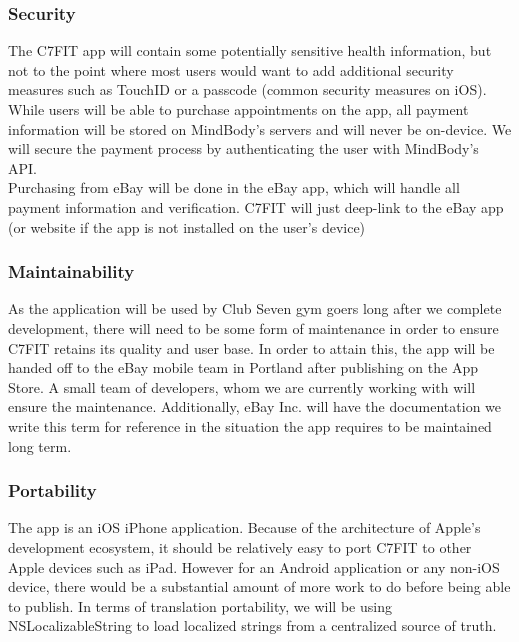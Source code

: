 \documentclass[letterpaper,10pt,titlepage]{article}
\begin{document}
\subsubsection{Security}

The C7FIT app will contain some potentially sensitive health information, but not to the point where most users would want to add additional security measures such as TouchID or a passcode (common security measures on iOS). While users will be able to purchase appointments on the app, all payment information will be stored on MindBody’s servers and will never be on-device. We will secure the payment process by authenticating the user with MindBody’s API.\\

Purchasing from eBay will be done in the eBay app, which will handle all payment information and verification. C7FIT will just deep-link to the eBay app (or website if the app is not installed on the user’s device)

\subsubsection{Maintainability}

As the application will be used by Club Seven gym goers long after we complete development, there will need to be some form of maintenance in order to ensure C7FIT retains its quality and user base. In order to attain this, the app will be handed off to the eBay mobile team in Portland after publishing on the App Store. A small team of developers, whom we are currently working with will ensure the maintenance. Additionally, eBay Inc. will have the documentation we write this term for reference in the situation the app requires to be maintained long term.

\subsubsection{Portability}

The app is an iOS iPhone application. Because of the architecture of Apple’s development ecosystem, it should be relatively easy to port C7FIT to other Apple devices such as iPad. However for an Android application or any non-iOS device, there would be a substantial amount of more work to do before being able to publish. In terms of translation portability, we will be using NSLocalizableString to load localized strings from a centralized source of truth.\\
\end{document}
